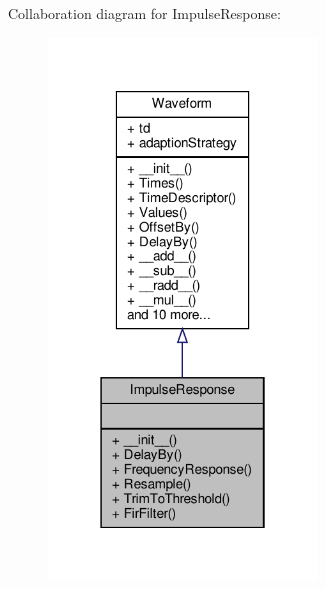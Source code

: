 Collaboration diagram for Impulse\+Response\+:\nopagebreak
\begin{figure}[H]
\begin{center}
\leavevmode
\includegraphics[width=202pt]{classSignalIntegrity_1_1TimeDomain_1_1Waveform_1_1ImpulseResponse_1_1ImpulseResponse__coll__graph}
\end{center}
\end{figure}
